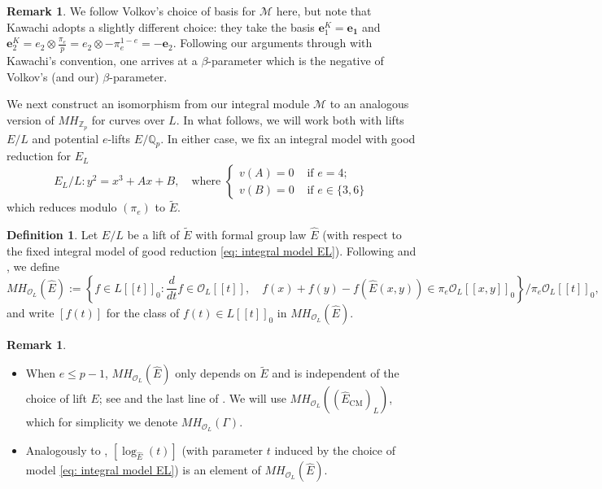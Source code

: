 \documentclass{amsart}
\theoremstyle{definition}
\newtheorem{definition}[theorem]{Definition}
\newtheorem{remark}[theorem]{Remark}
\newcommand{\Z}{\mathbb{Z}}
\newcommand{\Q}{\mathbb{Q}}
\numberwithin{theorem}{section}
\numberwithin{equation}{section}
\begin{document}
\begin{remark}\label{rmk: Kawachi vs Volkov}
We follow Volkov's choice of basis for $\mathcal{M}$ here, but note that Kawachi adopts a slightly different choice: they take the basis $\mathbf{e}_1^K=\mathbf{e_1}$ and $\mathbf{e}_2^K=e_2 \otimes \frac{\pi_e}{p} =e_2 \otimes -\pi_e^{1-e} = -\mathbf{e}_2$. Following our arguments through with Kawachi's convention, one arrives at a $\beta$-parameter which is the negative of Volkov's (and our) $\beta$-parameter.
\end{remark}

We next construct an isomorphism from our integral module $\mathcal{M}$ to an analogous version of $MH_{\Z_p}$ for curves over $L$. In what follows, we will work both with lifts $E/L$ and potential $e$-lifts $E/\Q_p$. In either case, we fix an integral model with good reduction for $E_L$
\begin{equation}\label{eq: integral model EL}
    E_L/L :y^2=x^3+Ax+B, \quad \text{where } \begin{cases}
        v(A)=0 & \text{ if } e=4; \\
        v(B)=0 & \text{ if } e \in \{3,6\}
    \end{cases}
\end{equation}
which reduces modulo $(\pi_e)$ to $\tilde{E}$.

\begin{definition}\label{def: MHOL} 
Let $E/L$ be a lift of $\tilde{E}$ with formal group law $\hat{E}$ (with respect to the fixed integral model of good reduction \eqref{eq: integral model EL}). Following \cite[p.~698]{Kawachi} and \cite[IV, \S 4.1]{Fontaine-p-divisible}, we define
\[
MH_{\mathcal{O}_L}(\hat{E}) := \left\{f \in L[[t]]_0 : \frac{d}{dt}f \in \mathcal{O}_L[[t]], \quad f(x)+f(y) -f(\hat{E}(x,y)) \in \pi_e\mathcal{O}_L[[x,y]]_0 \right\}/\pi_e\mathcal{O}_L[[t]]_0,
\]
{and write $[f(t)]$ for the class of $f(t) \in L[[t]]_0$ in $MH_{\mathcal{O}_L}(\hat{E})$.}
\end{definition}


\begin{remark}\label{rmk: MH indep of lift}
\phantom{~}
\begin{itemize}
\item When $e\leq p-1$, $MH_{\mathcal{O}_L}(\hat{E})$ only depends on $\tilde{E}$ and is independent of the choice of lift $E$; see \cite[IV, Proposition 4.1]{Fontaine-p-divisible} and the last line of \cite[IV.3]{Fontaine-p-divisible}. We will use $MH_{\mathcal{O}_L}((\hat{E}_{\mathrm{CM}})_{L})$, which for simplicity we denote $MH_{\mathcal{O}_L}(\Gamma)$.
\item Analogously to , $[\log_{\hat{E}}(t)]$ (with parameter $t$ induced by the choice of model \eqref{eq: integral model EL}) is an element of $MH_{\mathcal{O}_L}(\hat{E})$. 
\end{itemize}
\end{remark}
\end{document}
